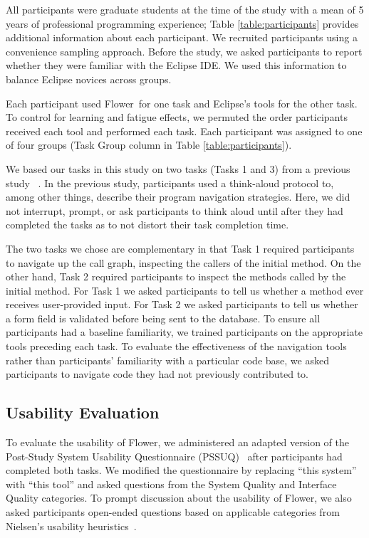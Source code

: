 \documentclass[conference]{IEEEtran}
\newcommand{\toolName}{Flower}
\begin{document}
All participants were graduate students at the time of the study with a mean of 5 years of professional programming experience; Table \ref{table:participants} provides additional information about each participant. We recruited participants using a convenience sampling approach. 
Before the study, we asked participants to report whether they were familiar with the Eclipse IDE. We used this information to balance Eclipse novices across groups.

Each participant used \toolName~for one task and Eclipse's tools for the other task.
To control for learning and fatigue effects, we permuted the order participants received each tool and performed each task. 
Each participant was assigned to one of four groups (Task Group column in Table \ref{table:participants}).

We based our tasks in this study on two tasks (Tasks 1 and 3) from a previous study ~\cite{Smith2015}.
In the previous study, participants used a think-aloud protocol to, among other things, describe their program navigation strategies.
Here, we did not interrupt, prompt, or ask participants to think aloud until after they had completed the tasks as to not distort their task completion time.

The two tasks we chose are complementary in that Task 1 required participants to navigate up the call graph, inspecting the callers of the initial method. 
On the other hand, Task 2 required participants to inspect the methods called by the initial method.
For Task 1 we asked participants to tell us whether a method ever receives user-provided input.
For Task 2 we asked participants to tell us whether a form field is validated before being sent to the database.
To ensure all participants had a baseline familiarity, we trained participants on the appropriate tools preceding each task. 
To evaluate the effectiveness of the navigation tools rather than participants' familiarity with a particular code base, we asked participants to navigate code they had not previously contributed to. 


\subsection{Usability Evaluation}
To evaluate the usability of \toolName, we administered an adapted version of the Post-Study System Usability Questionnaire (PSSUQ)~\cite{Lewis95ibmcomputer} after participants had completed both tasks. We modified the questionnaire by replacing ``this system'' with ``this tool'' and asked questions from the System Quality and Interface Quality categories.
To prompt discussion about the usability of \toolName, we also asked participants open-ended questions based on applicable categories from Nielsen's usability heuristics~\cite{Nielsen1992}.
\end{document}
